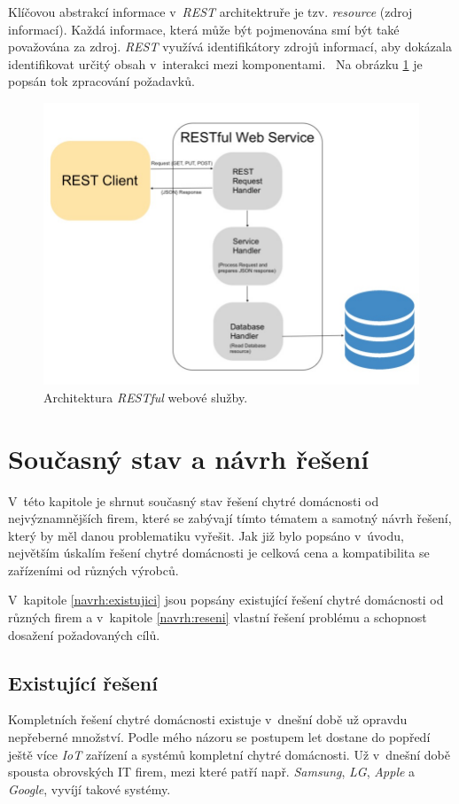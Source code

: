Klíčovou abstrakcí informace v~\emph{REST} architektruře je tzv. \emph{resource} (zdroj informací).
Každá informace, která může být pojmenována smí být také považována za zdroj.
\emph{REST} využívá identifikátory zdrojů informací, aby dokázala identifikovat určitý obsah v~interakci mezi komponentami.~\cite{restful:info}
Na obrázku \ref{figure:restful} je popsán tok zpracování požadavků.

\begin{figure}[ht]
  \centering
  \includegraphics[width=.59 \linewidth]{obrazky-figures/restful.jpg}
  \caption{Architektura \emph{RESTful} webové služby.~\cite{restful:example}}
  \label{figure:restful}
\end{figure}

\chapter{Současný stav a návrh řešení}
\label{navrh}

V~této kapitole je shrnut současný stav řešení chytré domácnosti od nejvýznamnějších firem, které se zabývají tímto tématem a samotný návrh řešení, který by měl danou problematiku vyřešit.
Jak již bylo popsáno v~úvodu, největším úskalím řešení chytré domácnosti je celková cena a kompatibilita se zařízeními od různých výrobců.

V~kapitole \ref{navrh:existujici} jsou popsány existující řešení chytré domácnosti od různých firem a v~kapitole \ref{navrh:reseni} vlastní řešení problému a schopnost dosažení požadovaných cílů.

\section*{Existující řešení}
\label{navrh:existujici}

Kompletních řešení chytré domácnosti existuje v~dnešní době už opravdu nepřeberné množství. Podle mého názoru se postupem let dostane do popředí ještě více \emph{IoT} zařízení a systémů kompletní chytré domácnosti.
Už v~dnešní době spousta obrovských IT firem, mezi které patří např. \emph{Samsung}, \emph{LG}, \emph{Apple} a \emph{Google}, vyvíjí takové systémy.

